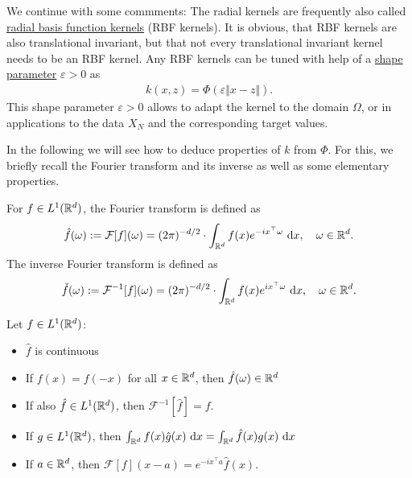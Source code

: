 We continue with some commments:
The radial kernels are frequently also called \underline{radial basis function kernels} (RBF kernels).
It is obvious, that RBF kernels are also translational invariant,
but that not every translational invariant kernel needs to be an RBF kernel.
Any RBF kernels can be tuned with help of a \underline{shape parameter} $\varepsilon > 0$ as
\begin{align*}
k(x, z) = \Phi(\varepsilon \Vert x - z \Vert).
\end{align*}
This shape parameter $\varepsilon > 0$ allows to adapt the kernel to the domain $\Omega$,
or in applications to the data $X_N$ and the corresponding target values.

In the following we will see how to deduce properties of $k$ from $\Phi$.
For this, we briefly recall the Fourier transform and its inverse as well as some elementary properties.

\begin{definition}
For $f \in L^1(\mathbb{R}^d)$, the Fourier transform is defined as
\begin{align*}
\hat{f}(\omega) := \mathcal{F}[f](\omega) = (2\pi)^{-d/2} \cdot \int_{\mathbb{R}^d} f(x) e^{-ix^\top \omega} ~ \mathrm{d}x, \quad \omega \in \mathbb{R}^d.
\end{align*}
The inverse Fourier transform is defined as
\begin{align*}
\check{f}(\omega) := \mathcal{F}^{-1}[f](\omega) = (2\pi)^{-d/2} \cdot \int_{\mathbb{R}^d} f(x) e^{ix^\top \omega} ~ \mathrm{d}x, \quad \omega \in \mathbb{R}^d.
\end{align*}
\end{definition}

\begin{prop}
\label{prop:fourier_transform}
Let $f \in L^1(\mathbb{R}^d)$:
\begin{itemize}
\item $\hat{f}$ is continuous
\item If $f(x) = f(-x)$ for all $x \in \mathbb{R}^d$, then $\hat{f}(\omega) \in \mathbb{R}^d$
\item If also $\hat{f} \in L^1(\mathbb{R}^d)$, then $\mathcal{F}^{-1}[\hat{f}] = f$.
\item If $g \in L^1(\mathbb{R}^d)$, then $\int_{\mathbb{R}^d} f(x) \hat{g}(x) ~ \mathrm{d}x = \int_{\mathbb{R}^d} \hat{f}(x) g(x) ~ \mathrm{d}x$
\item If $a \in \mathbb{R}^d$, then $\mathcal{F}[f](x-a) = e^{-ix^\top a} \hat{f}(x)$.
\end{itemize}
\end{prop}

